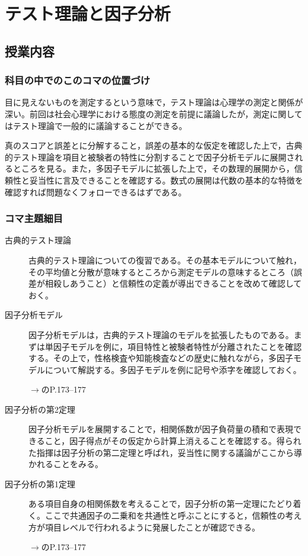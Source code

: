 \section{テスト理論と因子分析}
\subsection{授業内容}
\subsubsection{科目の中でのこのコマの位置づけ}
目に見えないものを測定するという意味で，テスト理論は心理学の測定と関係が深い。前回は社会心理学における態度の測定を前提に議論したが，測定に関してはテスト理論で一般的に議論することができる。

真のスコアと誤差とに分解すること，誤差の基本的な仮定を確認した上で，古典的テスト理論を項目と被験者の特性に分割することで因子分析モデルに展開されるところを見る。また，多因子モデルに拡張した上で，その数理的展開から，信頼性と妥当性に言及できることを確認する。数式の展開は代数の基本的な特徴を確認すれば問題なくフォローできるはずである。

\subsubsection{コマ主題細目}
\begin{description}
    \item[古典的テスト理論]古典的テスト理論についての復習である。その基本モデルについて触れ，その平均値と分散が意味するところから測定モデルの意味するところ（誤差が相殺しあうこと）と信頼性の定義が導出できることを改めて確認しておく。
    \item[因子分析モデル]因子分析モデルは，古典的テスト理論のモデルを拡張したものである。まずは単因子モデルを例に，項目特性と被験者特性が分離されたことを確認する。その上で，性格検査や知能検査などの歴史に触れながら，多因子モデルについて解説する。多因子モデルを例に記号や添字を確認しておく。
    \begin{flushright}
        $\to$\citet{kosugi2018}のP.173--177
    \end{flushright} 
    \item[因子分析の第2定理]因子分析モデルを展開することで，相関係数が因子負荷量の積和で表現できること，因子得点がその仮定から計算上消えることを確認する。得られた指揮は因子分析の第二定理と呼ばれ，妥当性に関する議論がここから導かれることをみる。
    \item[因子分析の第1定理]ある項目自身の相関係数を考えることで，因子分析の第一定理にたどり着く。ここで共通因子の二乗和を共通性と呼ぶことにすると，信頼性の考え方が項目レベルで行われるように発展したことが確認できる。
    \begin{flushright}
        $\to$\citet{kosugi2018}のP.173--177
    \end{flushright}  
\end{description}
